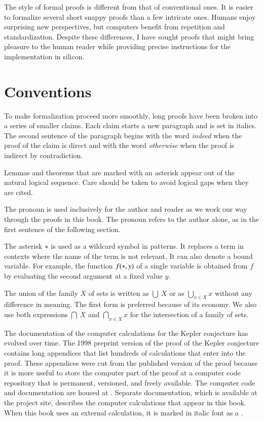 The style of formal proofs is different from that of conventional
ones.  It is easier to formalize several short snappy proofs
than a few intricate ones.  Humans enjoy surprising new perspectives,
but computers benefit from repetition and standardization.  Despite
these differences, I have sought  proofs that might bring
pleasure to the human reader while providing precise instructions for
the implementation in silicon.

\section*{Conventions}

To make formalization proceed more smoothly, long proofs have been
broken into a series of smaller claims.  Each claim starts a new paragraph
and is set in italics.  The second sentence of the paragraph begins with
the word {\it indeed} when the proof of the claim is direct and with
the word {\it otherwise} when the proof is indirect by contradiction.

Lemmas and theorems that are marked with an asterisk appear out of
the natural logical sequence.  Care should be taken to avoid logical gaps
when they are cited.

The pronoun  is used
inclusively for the author and reader as we work our way through the
proofs in this book.  The pronoun  refers to the author alone, as in the first sentence of
the following section.

The asterisk ${*}$ is used as a wildcard symbol in patterns.  It
replaces a term in contexts where the name of the term is not
relevant.  It can also denote a bound variable.  For example, the
function $f({*},y)$ of a single variable is obtained from $f$ by
evaluating the second argument at a fixed value $y$.

The union of the family $X$ of sets is written as $\bigcup\ X$ or as
$\bigcup_{x\in X} x$ without any difference in meaning.  The first form
is preferred because of its economy.  We also use both expressions
$\bigcap\ X$ and $\bigcap_{x\in X} x$ for the intersection of a family of sets.

The documentation of the computer calculations for the Kepler
conjecture has evolved over time.  The 1998 preprint version of the
proof of the Kepler conjecture contains long appendices that list
hundreds of calculations that enter into the proof.  These appendices
were cut from the published version of the proof because it is more
useful to store the computer part of the proof at a computer code
repository that is permanent, versioned, and freely available.  The
computer code and documentation are housed at .  Separate documentation, which is available at the
project site, describes the computer calculations that appear in this
book.  When this book uses an external calculation, it is marked in
italic font as a .

